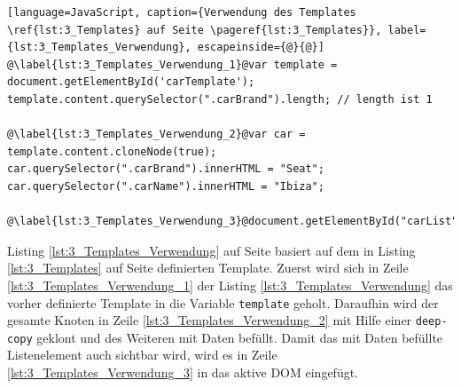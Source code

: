 \begin{lstlisting}[language=JavaScript, caption={Verwendung des Templates \ref{lst:3_Templates} auf Seite \pageref{lst:3_Templates}}, label={lst:3_Templates_Verwendung}, escapeinside={@}{@}]
@\label{lst:3_Templates_Verwendung_1}@var template = document.getElementById('carTemplate');
template.content.querySelector(".carBrand").length; // length ist 1

@\label{lst:3_Templates_Verwendung_2}@var car = template.content.cloneNode(true);
car.querySelector(".carBrand").innerHTML = "Seat";
car.querySelector(".carName").innerHTML = "Ibiza";

@\label{lst:3_Templates_Verwendung_3}@document.getElementById("carList").appendChild(car);
\end{lstlisting}
Listing \ref{lst:3_Templates_Verwendung} auf Seite \pageref{lst:3_Templates_Verwendung} basiert auf dem in Listing \ref{lst:3_Templates} auf Seite \pageref{lst:3_Templates} definierten Template. Zuerst wird sich in Zeile \ref{lst:3_Templates_Verwendung_1} der Listing \ref{lst:3_Templates_Verwendung} das vorher definierte Template in die Variable \lstinline|template| geholt. Daraufhin wird der gesamte Knoten in Zeile \ref{lst:3_Templates_Verwendung_2} mit Hilfe einer \lstinline|deep-copy| geklont und des Weiteren mit Daten befüllt. Damit das mit Daten befüllte Listenelement auch sichtbar wird, wird es in Zeile \ref{lst:3_Templates_Verwendung_3} in das aktive DOM eingefügt.
